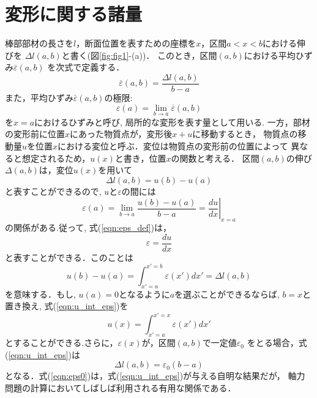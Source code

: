 \documentclass[10pt,a4j]{jbook}
\begin{document}
\section{変形に関する諸量}
棒部部材の長さを$l$，断面位置を表すための座標を$x$，区間$a<x<b$における伸びを
$\Delta l (a,b)$と書く(図\ref{fig:fig1}-(a))．
このとき，区間$(a,b)$における平均ひずみ$\overline{\varepsilon}(a,b)$
を次式で定義する．
\begin{equation}
	\overline{\varepsilon}(a,b) =\frac{\Delta l (a,b)}{b-a}
	\label{eqn:eps_bar}
\end{equation}
また，平均ひずみ$\bar{\varepsilon}(a,b)$の極限:
\begin{equation}
	\varepsilon(a)=\lim_{b \rightarrow a}\overline{\varepsilon}(a,b)
	\label{eqn:eps_def}
\end{equation}
を$x=a$におけるひずみと呼び, 局所的な変形を表す量として用いる. 
一方，部材の変形前に位置$x$にあった物質点が，変形後$x+u$に移動するとき，
物質点の移動量$u$を位置$x$における変位と呼ぶ．変位は物質点の変形前の位置によって
異なると想定されるため，$u(x)$と書き，位置$x$の関数と考える．
区間$(a,b)$の伸び$\Delta(a,b)$は，変位$u(x)$を用いて
\begin{equation}
	\Delta l(a,b)=u(b)-u(a)
	\label{eqn:dell_u}
\end{equation}
と表すことができるので, $u$と$\varepsilon$の間には
\begin{equation}
	\varepsilon(a) = \lim _{b\rightarrow a} \frac{u(b)-u(a)}{b-a}= \left.\frac{du}{dx}\right|_{x=a}
	\label{eqn:eps_u}
\end{equation}
の関係がある.従って, 式(\ref{eqn:eps_def})は，
\begin{equation}
	\varepsilon=\frac{du}{dx}
	\label{eqn:e_dudx}
\end{equation}
と表すことができる．このことは
\begin{equation}
	u(b)-u(a)=\int_{x'=a}^{x'=b} \varepsilon(x') dx'=\Delta l (a,b)
	\label{eqn:u_int_eps}
\end{equation}
を意味する．もし, $u(a)=0$となるように$a$を選ぶことができるならば, 
$b=x$と置き換え, 式(\ref{eqn:u_int_eps})を
\begin{equation}
	u(x)=\int_{x'=a}^{x'=x} \varepsilon(x') dx'
	\label{eqn:u_int_eps0}
\end{equation}
とすることができる.さらに，$\varepsilon(x)$が，区間$(a,b)$で一定値$\varepsilon_0$
をとる場合，式(\ref{eqn:u_int_eps})は
\begin{equation}
	\Delta l(a,b)=\varepsilon_0 (b-a)
	\label{eqn:eps0}
\end{equation}
となる．式(\ref{eqn:eps0})は，式(\ref{eqn:u_int_eps})が与える自明な結果だが，
軸力問題の計算においてしばしば利用される有用な関係である．
\end{document}
